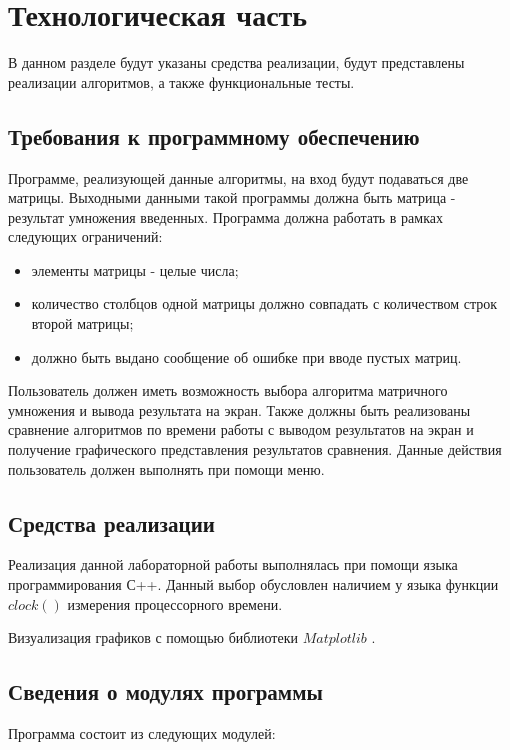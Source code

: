 \chapter{Технологическая часть}

В данном разделе будут указаны средства реализации, будут представлены реализации алгоритмов, а также функциональные тесты.

\section{Требования к программному обеспечению}
Программе, реализующей данные алгоритмы, на вход будут подаваться две матрицы. Выходными данными такой программы должна быть матрица - результат умножения введенных. Программа должна работать в рамках следующих ограничений: 

\begin{itemize}
	\item элементы матрицы - целые числа;
	\item количество столбцов одной матрицы должно совпадать с количеством строк второй матрицы;
	\item должно быть выдано сообщение об ошибке при вводе пустых матриц.
\end{itemize}

Пользователь должен иметь возможность выбора алгоритма матричного умножения и вывода результата на экран. Также должны быть реализованы сравнение алгоритмов по времени работы с выводом результатов на экран и получение графического представления результатов сравнения. Данные действия пользователь должен выполнять при помощи меню.

\section{Средства реализации}

Реализация данной лабораторной работы выполнялась при помощи языка программирования С++. Данный выбор обусловлен наличием у языка функции $clock()$ \cite {clock} измерения процессорного времени.

Визуализация графиков с помощью библиотеки $Matplotlib$ \cite {matplot}.

\section{Сведения о модулях программы}

Программа состоит из следующих модулей:

